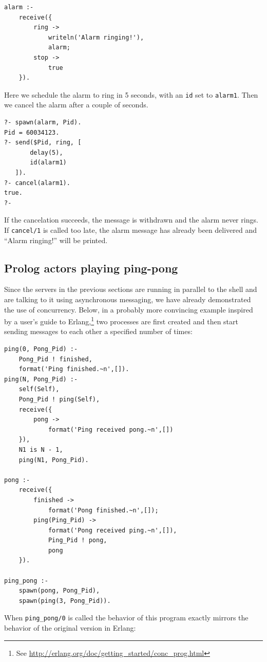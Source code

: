\begin{verbatim}
alarm :-
    receive({
        ring ->
            writeln('Alarm ringing!'),
            alarm;
        stop ->
            true
    }).
\end{verbatim}

\noindent Here we schedule the alarm to ring in 5 seconds, with an \texttt{id} set to \texttt{alarm1}. Then we cancel the alarm after a couple of seconds.

\begin{verbatim}
?- spawn(alarm, Pid).
Pid = 60034123.
?- send($Pid, ring, [
       delay(5),
       id(alarm1)
   ]).
?- cancel(alarm1).
true.
?-
\end{verbatim}

\noindent If the cancelation succeeds, the message is withdrawn and the alarm never rings. If \texttt{cancel/1} is called too late, the alarm message has already been delivered and ``Alarm ringing!'' will be printed.

\subsection{Prolog actors playing ping-pong}\label{sec:actors-and-concurrency}

\noindent Since the servers in the previous sections are running in parallel to the shell and are talking to it using asynchronous messaging, we have already demonstrated the use of concurrency. Below, in a probably more convincing example inspired by a user's guide to Erlang,\footnote{See \url{http://erlang.org/doc/getting\_started/conc\_prog.html}} two processes are first created and then start sending messages to each other a specified number of times:

\begin{verbatim}
ping(0, Pong_Pid) :-
    Pong_Pid ! finished,
    format('Ping finished.~n',[]).
ping(N, Pong_Pid) :-
    self(Self),
    Pong_Pid ! ping(Self),
    receive({
        pong -> 
            format('Ping received pong.~n',[])
    }),
    N1 is N - 1,
    ping(N1, Pong_Pid).

pong :-
    receive({
        finished ->
            format('Pong finished.~n',[]);
        ping(Ping_Pid) ->
            format('Pong received ping.~n',[]),
            Ping_Pid ! pong,
            pong
    }).

ping_pong :-
    spawn(pong, Pong_Pid),
    spawn(ping(3, Pong_Pid)).
\end{verbatim}

\noindent When \texttt{ping\_pong/0} is called the behavior of this program exactly mirrors the behavior of the original version in Erlang:


